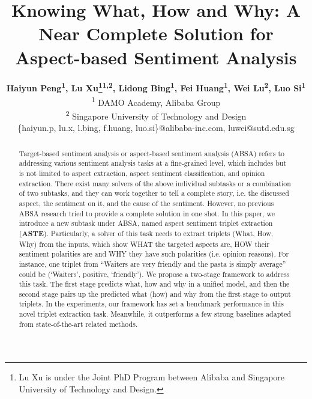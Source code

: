 \documentclass[letterpaper]{article} \usepackage{aaai20}  \usepackage{times}  \usepackage{helvet} \usepackage{courier}  \usepackage[hyphens]{url}  \usepackage{graphicx} \urlstyle{rm} \def\UrlFont{\rm}  \usepackage{graphicx}  \frenchspacing  \setlength{\pdfpagewidth}{8.5in}  \setlength{\pdfpageheight}{11in}
\title{Knowing What, How and Why: A Near Complete Solution for Aspect-based Sentiment Analysis}
\author{\Large \textbf{ Haiyun Peng\textsuperscript{\rm 1}, Lu Xu\thanks{Lu Xu is under the Joint PhD Program between Alibaba and Singapore University of Technology and Design.}\textsuperscript{\rm 1,2}, Lidong Bing\textsuperscript{\rm 1}, Fei Huang\textsuperscript{\rm 1}, Wei Lu\textsuperscript{\rm 2}, Luo Si\textsuperscript{\rm 1}}\\
\textsuperscript{\rm 1} DAMO Academy, Alibaba Group \\
\textsuperscript{\rm 2} Singapore University of Technology and Design\\
{\{haiyun.p, lu.x, l.bing, f.huang, luo.si\}}@alibaba-inc.com, luwei@sutd.edu.sg }
\begin{document}
\maketitle

\begin{abstract}
Target-based sentiment analysis or aspect-based sentiment analysis (ABSA) refers to addressing various sentiment analysis tasks at a fine-grained level, which includes but is not limited to aspect extraction, aspect sentiment classification, and opinion extraction.  There exist many solvers of the above individual subtasks or a combination of two subtasks, and they can work together to tell a complete story, i.e. the discussed aspect, the sentiment on it, and the cause of the sentiment.  However, no previous ABSA research tried to provide a complete solution in one shot. In this paper, we introduce a new subtask under ABSA, named aspect sentiment triplet extraction (\textbf{ASTE}). Particularly, a solver of this task needs to extract triplets (What, How, Why) from the inputs, which show WHAT the targeted aspects are, HOW their sentiment polarities are and WHY they have such polarities (i.e. opinion reasons). For instance, one triplet from ``Waiters are very friendly and the pasta is simply average'' could be (`Waiters', positive, `friendly'). We propose a two-stage framework to address this task. The first stage predicts what, how and why in a unified model, and then the second stage pairs up the predicted what (how) and why from the first stage to output triplets. In the experiments, our framework has set a benchmark performance in this novel triplet extraction task. Meanwhile, it outperforms a few strong baselines adapted from state-of-the-art related methods. 
\end{abstract}
\end{document}

